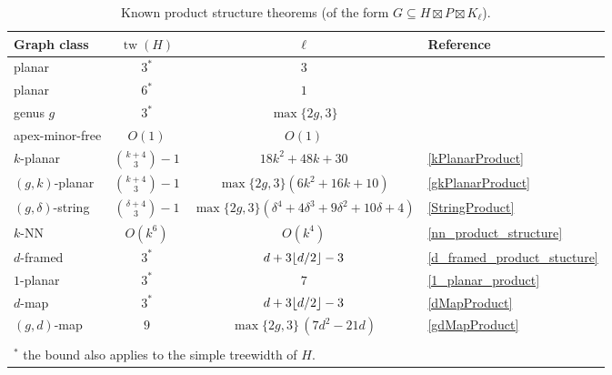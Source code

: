 \documentclass{patmorin}
\theoremstyle{plain}
\theoremstyle{definition}
\DeclareMathOperator{\tw}{tw}
\DeclarePairedDelimiter{\floor}{\lfloor}{\rfloor}
\begin{document}
\begin{table}[h]
  \begin{center}
    \begin{tabular}{lccl}
      \textbf{Graph class} & \boldmath $\tw(H)$ & \boldmath $\ell$ & \textbf{Reference} \\ \hline
      planar & $3^*$ & $3$ & \cite{DJMMUW20} \\
      planar & $6^*$ & $1$ & \cite{UWY} \\
      genus $g$ & $3^*$ & $\max\{2g,3\}$ & \cite{DHHW} \\
      apex-minor-free & $O(1)$ & $O(1)$ & \cite{DJMMUW20} \\[1ex]
      $k$-planar & $\binom{k+4}{3}-1$ & $18k^2 + 48k + 30$ & \cref{kPlanarProduct} \\
      $(g,k)$-planar & $\binom{k+4}{3}-1$ & $\max\{2g,3\}(6k^2+16k+10)$ & \cref{gkPlanarProduct} \\
      $(g,\delta)$-string & $\binom{\delta+4}{3}-1$ & $\max\{2g,3\}(\delta^4 + 4\delta^3 + 9\delta^2 + 10\delta+4)$ & \cref{StringProduct} \\
      $k$-NN & $O(k^6)$ & $O(k^4)$ & \cref{nn_product_structure} \\
      $d$-framed & $3^*$ & $d+ 3\floor{d/2} - 3$ & \cref{d_framed_product_stucture} \\
      $1$-planar & $3^*$ & $7$ & \cref{1_planar_product} \\
      $d$-map & $3^*$ & $d+ 3\floor{d/2} - 3$ & \cref{dMapProduct} \\
      $(g,d)$-map & $9$ & $\max\{2g,3\}\,(7d^2 -21d)$ & \cref{gdMapProduct} \\ \hline
      \\[.2ex]
      \multicolumn{4}{l}{$^*$ the bound also applies to the simple treewidth of $H$.}
    \end{tabular}
  \end{center}
  \caption{Known product structure theorems (of the form $G\subseteq H\boxtimes P\boxtimes K_\ell$).}
  \label{summary_table}
\end{table}
\end{document}
